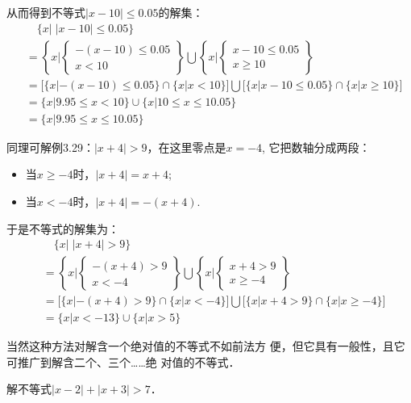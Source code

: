 从而得到不等式$|x-10|\le 0.05$的解集：
\[\begin{split}
  &\quad   \{x|\; |x-10|\le 0.05\}\\
  &=\left\{x\Big| \begin{cases}
    -(x-10)\le 0.05\\x<10
\end{cases}\right\}\bigcup \left\{x\Big| \begin{cases}
    x-10\le 0.05\\x\ge 10
\end{cases}\right\}\\
&=\Big[\{x|-(x-10)\le 0.05\}\cap\{x|x<10\}\Big]\bigcup\Big[\{x|x-10\le 0.05\}\cap\{x|x\ge 10\}\Big]\\
&=\{x|9.95\le x<10\}\cup\{x|10\le x\le 10.05\}\\
&=\{x|9.95\le x\le 10.05\}
\end{split}
    \]

    同理可解例3.29：$|x+4|>9$，在这里零点是$x=-4$, 它把数轴分成两段：
    \begin{itemize}
        \item  当$x\ge -4$时，$|x+4|=x+4$;
        \item  当$x<-4$时，$|x+4|=-(x+4)$.
    \end{itemize}
    于是不等式的解集为：
\[\begin{split}
    &\quad \{x|\; |x+4|>9\} \\
&= \left\{x\Big|\begin{cases}
    -(x+4)>9\\x<-4
\end{cases}\right\}\bigcup \left\{x\Big|\begin{cases}
    x+4>9\\x\ge -4
\end{cases}\right\}\\
    &=\Big[\{x|-(x+4)>9\}\cap\{x|x<-4\}\Big]\bigcup\Big[\{x|x+4>9\}\cap\{x|x\ge -4\}\Big]\\
    &=\{x|x<-13\}\cup\{x|x>5\}
\end{split}\]

当然这种方法对解含一个绝对值的不等式不如前法方
便，但它具有一般性，且它可推广到解含二个、三个……绝
对值的不等式．

\begin{example}
    解不等式$|x-2|+|x+3|>7$．
\end{example}

